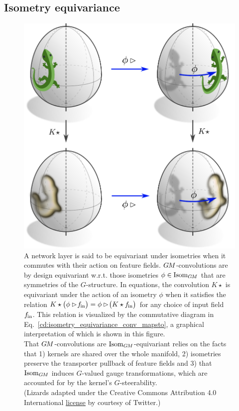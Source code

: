 

\subsection{Isometry equivariance}
\label{sec:gauge_conv_isom_equiv}


\begin{figure}
    \centering
    \includegraphics[width=.56\textwidth]{figures/lizard_conv_egg.pdf}
    \captionsetup{width=.89\textwidth}
    \caption[]{\small
        A network layer is said to be equivariant under isometries when it commutes with their action on feature fields.
        $G\mkern-1.4muM$-convolutions are by design equivariant w.r.t. those isometries $\phi\in \operatorname{Isom}_{G\mkern-1.4muM}$ that are symmetries of the $G$-structure.
        In equations, the convolution $K\star$ is equivariant under the action of an isometry $\phi$ when it satisfies the relation
        ${K \star \big( \phi\rhd\! f_\textup{\;\!\!in} \big) = \phi\rhd\! \big(K \star f_\textup{\;\!\!in} \big)}$
        for any choice of input field~$f_\textup{\;\!\!in}$.
        This relation is visualized by the commutative diagram in Eq.~\eqref{cd:isometry_equivariance_conv_mapsto}, a graphical interpretation of which is shown in this figure.
        \\[1ex]
        That $G\mkern-1.4muM$-convolutions are $\operatorname{Isom}_{G\mkern-1.4muM}$-equivariant relies on the facts that
        1) kernels are shared over the whole manifold,
        2) isometries preserve the transporter pullback of feature fields and
        3) that $\operatorname{Isom}_{G\mkern-1.4muM}$ induces $G$-valued gauge transformations, which are accounted for by the kernel's $G$-steerability.
        {\\
        \color{gray}
        \scriptsize
            (Lizards adapted under the Creative Commons Attribution 4.0 International
            \href{https://github.com/twitter/twemoji/blob/gh-pages/LICENSE-GRAPHICS}{\underline{license}}
            by courtesy of Twitter.)
        }
        \\[0ex]
        }
    \label{fig:lizard_conv_egg}
\end{figure}


